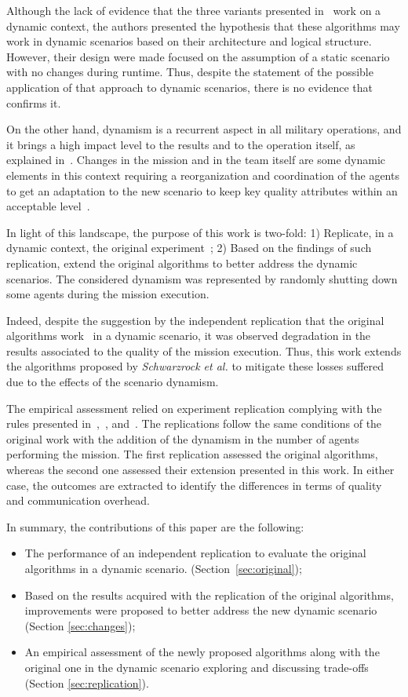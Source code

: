 Although the lack of evidence that the three variants presented in~\citep{MAS07} work on a dynamic context, the authors presented the hypothesis that these algorithms may work in dynamic scenarios based on their architecture and logical structure. However, their design were made focused on the assumption of a static scenario with no changes during runtime. Thus, despite the statement of the possible application of that approach to dynamic scenarios, there is no evidence that confirms it.

On the other hand, dynamism is a recurrent aspect in all military operations, and it brings a high impact level to the results and to the operation itself, as explained in~\citep{CC02}. Changes in the mission and in the team itself are some dynamic elements in this context requiring a reorganization and coordination of the agents to get an adaptation to the new scenario to keep key quality attributes within an acceptable level~\citep{FRANCE2014}. 

In light of this landscape, the purpose of this work is two-fold: 1) Replicate, in a dynamic context, the original experiment~\citep{MAS07}; 2) Based on the findings of such replication, extend the original algorithms to better address the dynamic scenarios. The considered dynamism was represented by randomly shutting down some agents during the mission execution.

Indeed, despite the suggestion by the independent replication that the original algorithms work~\citep{MAS07} in a dynamic scenario, it was observed degradation in the results associated to the quality of the mission execution. Thus, this work extends the algorithms proposed by \textit{Schwarzrock et al.} to mitigate these losses suffered due to the effects of the scenario dynamism.

The empirical assessment relied on experiment replication complying with the rules presented in~\citep{exp01},~\citep{exp03}, and~\citep{exp04}. The replications follow the same conditions of the original work with the addition of the dynamism in the number of agents performing the mission. The first replication assessed the original algorithms, whereas the second one assessed their extension presented in this work. In either case, the outcomes are extracted to identify the differences in terms of quality and communication overhead.

In summary, the contributions of this paper are the following:

\begin{itemize}
   \item The performance of an independent replication to evaluate the original algorithms in a dynamic scenario. (Section~\ref{sec:original});
   \item Based on the results acquired with the replication of the original algorithms, improvements were proposed to better address the new dynamic scenario (Section \ref{sec:changes});
   \item An empirical assessment of the newly proposed algorithms along with the original one in the dynamic scenario exploring and discussing trade-offs (Section \ref{sec:replication}).
\end{itemize}

